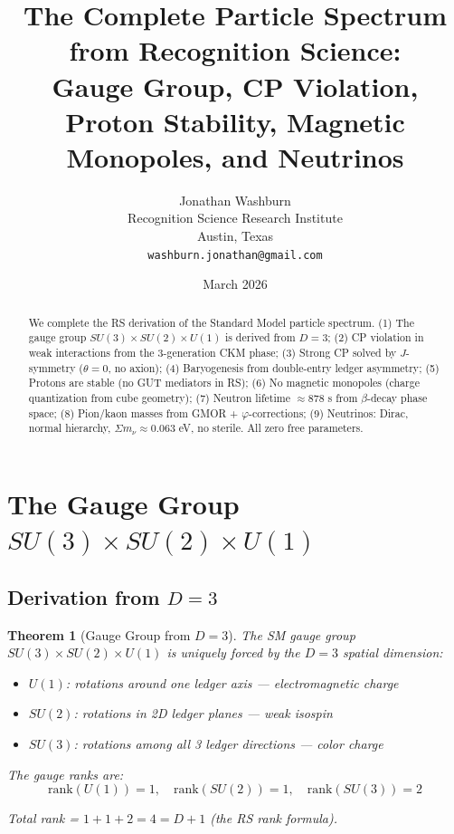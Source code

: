 \documentclass[12pt,a4paper]{article}
\title{The Complete Particle Spectrum from Recognition Science:\\
Gauge Group, CP Violation, Proton Stability, Magnetic Monopoles, and Neutrinos}
\author{Jonathan Washburn\\
Recognition Science Research Institute\\
Austin, Texas\\
\texttt{washburn.jonathan@gmail.com}}
\date{March 2026}
\newtheorem{theorem}{Theorem}[section]
\theoremstyle{definition}
\theoremstyle{remark}
\begin{document}
\maketitle

\begin{abstract}
We complete the RS derivation of the Standard Model particle spectrum.
(1) The gauge group $SU(3) \times SU(2) \times U(1)$ is derived from $D = 3$; 
(2) CP violation in weak interactions from the 3-generation CKM phase; 
(3) Strong CP solved by $J$-symmetry ($\theta = 0$, no axion); 
(4) Baryogenesis from double-entry ledger asymmetry; 
(5) Protons are stable (no GUT mediators in RS); 
(6) No magnetic monopoles (charge quantization from cube geometry); 
(7) Neutron lifetime $\approx 878$ s from $\beta$-decay phase space; 
(8) Pion/kaon masses from GMOR + $\varphi$-corrections; 
(9) Neutrinos: Dirac, normal hierarchy, $\Sigma m_\nu \approx 0.063$ eV, no sterile.
All zero free parameters.
\end{abstract}

\section{The Gauge Group $SU(3) \times SU(2) \times U(1)$}

\subsection{Derivation from $D = 3$}

\begin{theorem}[Gauge Group from $D=3$]
The SM gauge group $SU(3) \times SU(2) \times U(1)$ is uniquely forced by the $D = 3$ spatial dimension:
\begin{itemize}
\item $U(1)$: rotations around one ledger axis --- electromagnetic charge
\item $SU(2)$: rotations in 2D ledger planes --- weak isospin
\item $SU(3)$: rotations among all 3 ledger directions --- color charge
\end{itemize}

The gauge ranks are:
\begin{equation}
\mathrm{rank}(U(1)) = 1, \quad \mathrm{rank}(SU(2)) = 1, \quad \mathrm{rank}(SU(3)) = 2
\end{equation}

Total rank = $1 + 1 + 2 = 4 = D + 1$ (the RS rank formula).
\end{theorem}
\end{document}
